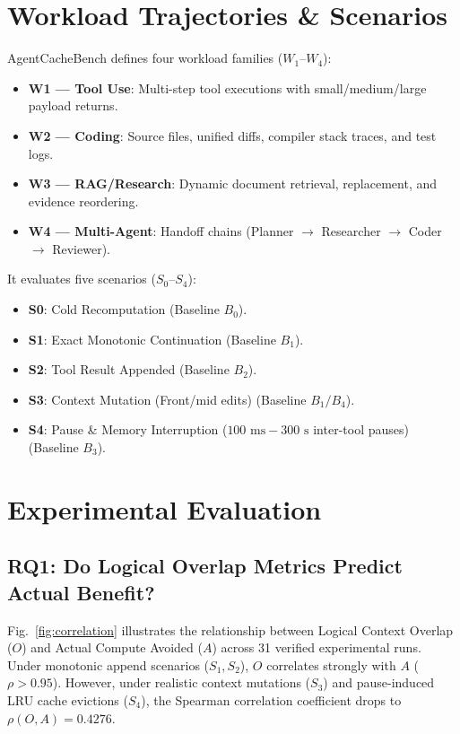 \documentclass[10pt,journal,compsoc]{IEEEtran}
\begin{document}
\section{Workload Trajectories \& Scenarios}

AgentCacheBench defines four workload families ($W_1$--$W_4$):
\begin{itemize}
    \item \textbf{W1 — Tool Use}: Multi-step tool executions with small/medium/large payload returns.
    \item \textbf{W2 — Coding}: Source files, unified diffs, compiler stack traces, and test logs.
    \item \textbf{W3 — RAG/Research}: Dynamic document retrieval, replacement, and evidence reordering.
    \item \textbf{W4 — Multi-Agent}: Handoff chains (Planner $\rightarrow$ Researcher $\rightarrow$ Coder $\rightarrow$ Reviewer).
\end{itemize}

It evaluates five scenarios ($S_0$--$S_4$):
\begin{itemize}
    \item \textbf{S0}: Cold Recomputation (Baseline $B_0$).
    \item \textbf{S1}: Exact Monotonic Continuation (Baseline $B_1$).
    \item \textbf{S2}: Tool Result Appended (Baseline $B_2$).
    \item \textbf{S3}: Context Mutation (Front/mid edits) (Baseline $B_1/B_4$).
    \item \textbf{S4}: Pause \& Memory Interruption ($100\text{ ms} - 300\text{ s}$ inter-tool pauses) (Baseline $B_3$).
\end{itemize}

\section{Experimental Evaluation}

\subsection{RQ1: Do Logical Overlap Metrics Predict Actual Benefit?}
Fig.~\ref{fig:correlation} illustrates the relationship between Logical Context Overlap ($O$) and Actual Compute Avoided ($A$) across 31 verified experimental runs. Under monotonic append scenarios ($S_1, S_2$), $O$ correlates strongly with $A$ ($\rho > 0.95$). However, under realistic context mutations ($S_3$) and pause-induced LRU cache evictions ($S_4$), the Spearman correlation coefficient drops to $\rho(O, A) = 0.4276$.
\end{document}
